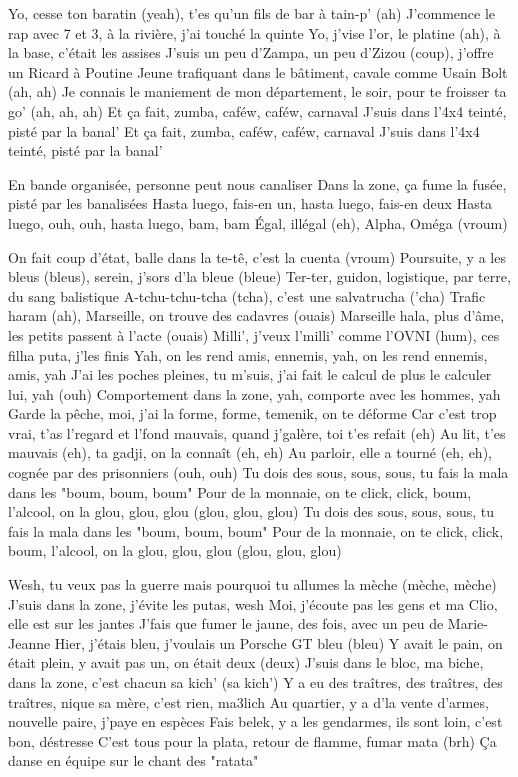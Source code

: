 \begin{guitar}
Yo, cesse ton baratin (yeah), t'es qu'un fils de bar à tain-p' (ah)
J'commence le rap avec 7 et 3, à la rivière, j'ai touché la quinte
Yo, j'vise l'or, le platine (ah), à la base, c'était les assises
J'suis un peu d'Zampa, un peu d'Zizou (coup), j'offre un Ricard à Poutine
Jeune trafiquant dans le bâtiment, cavale comme Usain Bolt (ah, ah)
Je connais le maniement de mon département, le soir, pour te froisser ta go' (ah, ah, ah)
Et ça fait, zumba, caféw, caféw, carnaval
J'suis dans l'4x4 teinté, pisté par la banal'
Et ça fait, zumba, caféw, caféw, carnaval
J'suis dans l'4x4 teinté, pisté par la banal'

En bande organisée, personne peut nous canaliser
Dans la zone, ça fume la fusée, pisté par les banalisées
Hasta luego, fais-en un, hasta luego, fais-en deux
Hasta luego, ouh, ouh, hasta luego, bam, bam
Égal, illégal (eh), Alpha, Oméga (vroum)

On fait coup d'état, balle dans la te-tê, c'est la cuenta (vroum)
Poursuite, y a les bleus (bleus), serein, j'sors d'la bleue (bleue)
Ter-ter, guidon, logistique, par terre, du sang balistique
A-tchu-tchu-tcha (tcha), c'est une salvatrucha ('cha)
Trafic haram (ah), Marseille, on trouve des cadavres (ouais)
Marseille hala, plus d'âme, les petits passent à l'acte (ouais)
Milli', j'veux l'milli' comme l'OVNI (hum), ces filha puta, j'les finis
Yah, on les rend amis, ennemis, yah, on les rend ennemis, amis, yah
J'ai les poches pleines, tu m'suis, j'ai fait le calcul de plus le calculer lui, yah (ouh)
Comportement dans la zone, yah, comporte avec les hommes, yah
Garde la pêche, moi, j'ai la forme, forme, temenik, on te déforme
Car c'est trop vrai, t'as l'regard et l'fond mauvais, quand j'galère, toi t'es refait (eh)
Au lit, t'es mauvais (eh), ta gadji, on la connaît (eh, eh)
Au parloir, elle a tourné (eh, eh), cognée par des prisonniers (ouh, ouh)
Tu dois des sous, sous, sous, tu fais la mala dans les "boum, boum, boum"
Pour de la monnaie, on te click, click, boum, l'alcool, on la glou, glou, glou (glou, glou, glou)
Tu dois des sous, sous, sous, tu fais la mala dans les "boum, boum, boum"
Pour de la monnaie, on te click, click, boum, l'alcool, on la glou, glou, glou (glou, glou, glou)

Wesh, tu veux pas la guerre mais pourquoi tu allumes la mèche (mèche, mèche)
J'suis dans la zone, j'évite les putas, wesh
Moi, j'écoute pas les gens et ma Clio, elle est sur les jantes
J'fais que fumer le jaune, des fois, avec un peu de Marie-Jeanne
Hier, j'étais bleu, j'voulais un Porsche GT bleu (bleu)
Y avait le pain, on était plein, y avait pas un, on était deux (deux)
J'suis dans le bloc, ma biche, dans la zone, c'est chacun sa kich' (sa kich')
Y a eu des traîtres, des traîtres, des traîtres, nique sa mère, c'est rien, ma3lich
Au quartier, y a d'la vente d'armes, nouvelle paire, j'paye en espèces
Fais belek, y a les gendarmes, ils sont loin, c'est bon, déstresse
C'est tous pour la plata, retour de flamme, fumar mata (brh)
Ça danse en équipe sur le chant des "ratata"


\end{guitar}
